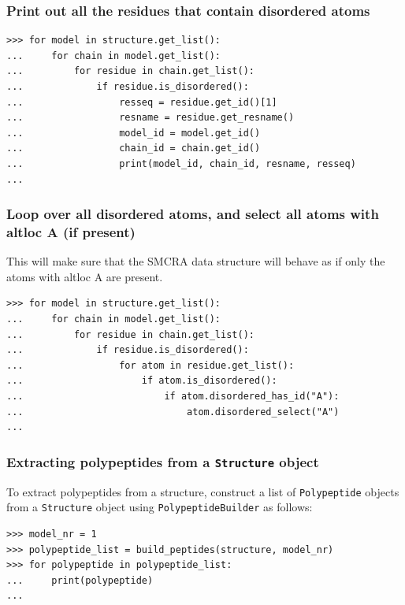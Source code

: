 \documentclass{report}
\begin{document}
\subsubsection*{Print out all the residues that contain disordered atoms}

\begin{verbatim}
>>> for model in structure.get_list():
...     for chain in model.get_list():
...         for residue in chain.get_list():
...             if residue.is_disordered():
...                 resseq = residue.get_id()[1]
...                 resname = residue.get_resname()
...                 model_id = model.get_id()
...                 chain_id = chain.get_id()
...                 print(model_id, chain_id, resname, resseq)
... 
\end{verbatim}

\subsubsection*{Loop over all disordered atoms, and select all atoms with altloc A (if present)}
This will make sure that the SMCRA data structure will behave as if only the
atoms with altloc A are present.

\begin{verbatim}
>>> for model in structure.get_list():
...     for chain in model.get_list():
...         for residue in chain.get_list():
...             if residue.is_disordered():
...                 for atom in residue.get_list():
...                     if atom.is_disordered():
...                         if atom.disordered_has_id("A"):
...                             atom.disordered_select("A")
...
\end{verbatim}

\subsubsection*{Extracting polypeptides from a \texttt{Structure} object\label{subsubsec:extracting_polypeptides}}

To extract polypeptides from a structure, construct a list of \texttt{Polypeptide} objects from a \texttt{Structure} object using \texttt{PolypeptideBuilder} as follows:

\begin{verbatim}
>>> model_nr = 1
>>> polypeptide_list = build_peptides(structure, model_nr)
>>> for polypeptide in polypeptide_list:
...     print(polypeptide)
...
\end{verbatim}
\end{document}
